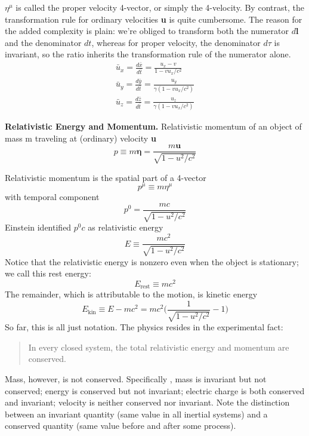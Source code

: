 \documentclass[../../main.tex]{subfiles}
\begin{document}
$\eta^\mu$ is called the proper velocity 4-vector, or simply the 4-velocity. By contrast, the transformation rule for ordinary velocities \textbf{u} is quite cumbersome. The reason for the added complexity is plain: we're obliged to transform both the numerator $d\mathbf{l}$ and the denominator $dt$, whereas for proper velocity, the denominator $d\tau$ is invariant, so the ratio inherits the transformation rule of the numerator alone.
\begin{align*}
    \bar{u}_x=\frac{d\bar{x}}{d\bar{t}}=\frac{u_x-v}{1-vu_x/c^2}\\
    \bar{u}_y=\frac{d\bar{y}}{d\bar{t}}=\frac{u_y}{\gamma(1-vu_x/c^2)}\\
    \bar{u}_z=\frac{d\bar{z}}{d\bar{t}}=\frac{u_z}{\gamma(1-vu_x/c^2)}
\end{align*}

\textbf{Relativistic Energy and Momentum.} Relativistic momentum of an object of mass m traveling at (ordinary) velocity \textbf{u} 
\begin{equation*}
    p\equiv m\mathbf{\eta}=\frac{m\mathbf{u}}{\sqrt{1-u^2/c^2}}
\end{equation*}

Relativistic momentum is the spatial part of a 4-vector
\begin{equation*}
    p^\mu\equiv m\eta^\mu
\end{equation*}
with temporal component
\begin{equation*}
    p^0=\frac{mc}{\sqrt{1-u^2/c^2}}
\end{equation*}
Einstein identified $p^0c$ as relativistic energy
\begin{equation*}
    E\equiv\frac{mc^2}{\sqrt{1-u^2/c^2}}
\end{equation*}
Notice that the relativistic energy is nonzero even when the object is stationary; we call this rest energy:
\begin{equation*}
E_{\text{rest}}\equiv mc^2
\end{equation*}
The remainder, which is attributable to the motion, is kinetic energy
\begin{equation*}
E_{\text{kin}}\equiv E-mc^2=mc^2\bigg(\frac{1}{\sqrt{1-u^2/c^2}}-1\bigg)
\end{equation*}
So far, this is all just notation. The physics resides in the experimental fact:
\begin{quote}
    In every closed system, the total relativistic energy and momentum are conserved.
\end{quote}
Mass, however, is not conserved. Specifically , mass is invariant but not conserved; energy is conserved but not invariant; electric charge is both conserved and invariant; velocity is neither conserved nor invariant. Note the distinction between an invariant quantity (same value in all inertial systems) and a conserved quantity (same value before and after some process).
\end{document}

